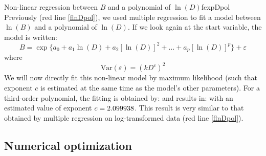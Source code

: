 \begin{filrouge}{Non-linear regression between $B$ and a polynomial of $\ln(D)$}{fexpDpol}%
Previously (red line \ref{flnDpol}), we used multiple regression to fit a model between $\ln(B)$ and a polynomial of $\ln(D)$. If we look again at the start variable, the model is written:
\[
B=\exp\{a_0+a_1\ln(D)+a_2[\ln(D)]^2+\ldots+a_p[\ln(D)]^p\}+\varepsilon
\]
where
\[
\mathrm{Var}(\varepsilon)=(kD^c)^2
\]
We will now directly fit this non-linear model by maximum likelihood (such that exponent $c$ is estimated at the same time as the model's other parameters). For a third-order polynomial, the fitting is obtained by:
%
and results in:
%
with an estimated value of exponent $c=\mbox{2.099938}$. This result is very similar to that obtained by multiple regression on log-transformed data (red line \ref{flnDpol}).
\end{filrouge}

\subsection{Numerical optimization\label{algo}}

